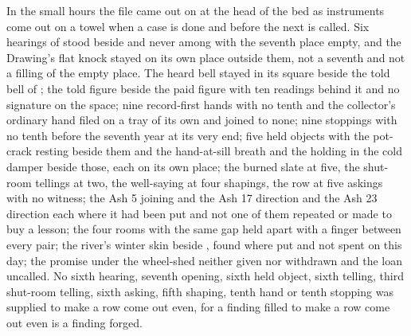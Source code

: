 In the small hours the file came out on  at the head of the bed as instruments come out on a towel when a case is done and before the next is called. Six hearings of  stood beside and never among with the seventh place empty, and the Drawing's flat knock stayed on its own place outside them, not a seventh and not a filling of the empty place. The heard bell stayed in its square beside the told bell of ; the told figure beside the paid figure with ten readings behind it and no signature on the space; nine record-first hands with no tenth and the collector's ordinary hand filed on a tray of its own and joined to none; nine stoppings with no tenth before the seventh year at its very end; five held objects with the pot-crack resting beside them and the hand-at-sill breath and the holding in the cold damper beside those, each on its own place; the burned slate at five, the shut-room tellings at two, the well-saying at four shapings, the row at five askings with no witness; the Ash 5 joining and the Ash 17 direction and the Ash 23 direction each where it had been put and not one of them repeated or made to buy a lesson; the four rooms with the same gap held apart with a finger between every pair; the river's winter skin beside , found where put and not spent on this day; the promise under the wheel-shed neither given nor withdrawn and the loan uncalled. No sixth hearing, seventh opening, sixth held object, sixth telling, third shut-room telling, sixth asking, fifth shaping, tenth hand or tenth stopping was supplied to make a row come out even, for a finding filled to make a row come out even is a finding forged.

